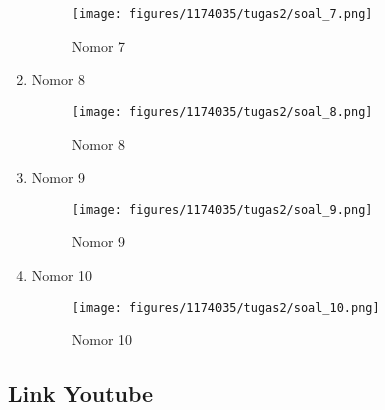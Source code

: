 \begin{enumerate}
\begin{figure}[H]
		\texttt{[image: figures/1174035/tugas2/soal\_7.png]}
		\centering
		\caption{Nomor 7}
	\end{figure}
    \item Nomor 8
    
    \begin{figure}[H]
		\texttt{[image: figures/1174035/tugas2/soal\_8.png]}
		\centering
		\caption{Nomor 8}
	\end{figure}
    \item Nomor 9
    
    \begin{figure}[H]
		\texttt{[image: figures/1174035/tugas2/soal\_9.png]}
		\centering
		\caption{Nomor 9}
	\end{figure}
    \item Nomor 10
    
    \begin{figure}[H]
		\texttt{[image: figures/1174035/tugas2/soal\_10.png]}
		\centering
		\caption{Nomor 10}
	\end{figure}
\end{enumerate}
\subsection{Link Youtube}